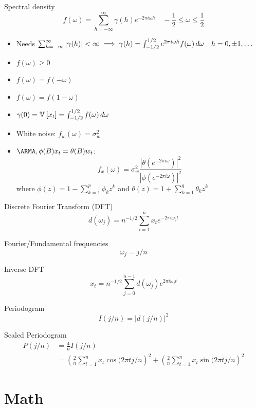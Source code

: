 \documentclass[landscape]{article}
\begin{document}
\begin{multicols*}{2}
Spectral density
\[f(\omega) = \sum_{h=-\infty}^\infty \gamma(h) e^{-2\pi i \omega h}
\quad -\frac{1}{2} \le \omega \le \frac{1}{2}\]
\begin{itemize}
  \item Needs $\sum_{h=-\infty}^\infty |\gamma(h)| < \infty
    \;\Longrightarrow\; \gamma(h) = \int_{-1/2}^{1/2} e^{2\pi i \omega h}f(\omega) \,d\omega
    \quad h=0,\pm1,\ldots$
  \item $f(\omega) \ge 0$
  \item $f(\omega) = f(-\omega)$
  \item $f(\omega) = f(1-\omega)$
  \item $\gamma(0) = \mathbb{V}_{}\left[x_t\right] = \int_{-1/2}^{1/2}f(\omega)\,d\omega$
  \item White noise: $f_w(\omega) = \sigma_w^2$
  \item $\ARMA, \phi(B)x_t = \theta(B)w_t$:
    \[f_x(\omega) = \sigma_w^2 \frac{|\theta(e^{-2\pi i
    \omega})|^2}{|\phi(e^{-2\pi i \omega})|^2}\]
    where $\phi(z) = 1 - \sum_{k=1}^p \phi_k z^k$ and
    $\theta(z) = 1 + \sum_{k=1}^q \theta_k z^k$
\end{itemize}

Discrete Fourier Transform (DFT)
\[d(\omega_j) = n^{-1/2} \sum_{i=1}^n x_t e^{-2\pi i\omega_j t}\]

Fourier/Fundamental frequencies
\[\omega_j = j/n\]

Inverse DFT
\[x_t = n^{-1/2} \sum_{j=0}^{n-1} d(\omega_j) e^{2\pi i\omega_j t}\]

Periodogram
\[I(j/n) = |d(j/n)|^2\]

Scaled Periodogram
\begin{align*}
P(j/n)
&= \frac{4}{n}I(j/n) \\
&=\left( \frac{2}{n} \sum_{t=1}^n x_t \cos(2\pi t j/n \right)^2
+ \left( \frac{2}{n} \sum_{t=1}^n x_t \sin(2\pi t j/n \right)^2
\end{align*}

\section{Math}


\end{multicols*}
\end{document}
